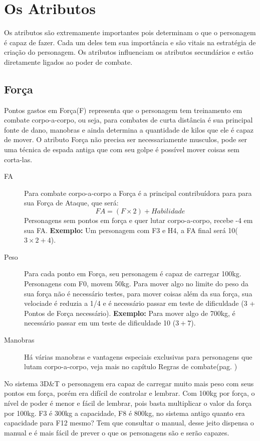 \chapter{Os Atributos}
\label{ch:attributes}

Os atributos são extremamente importantes pois determinam o que o personagem é capaz de fazer. Cada um deles tem sua importância e são vitais na estratégia de criação do personagem. Os atributos influenciam os atributos secundários e estão diretamente ligados ao poder de combate. 

\section{Força}

Pontos gastos em Força(F) representa que o personagem tem treinamento em combate corpo-a-corpo, ou seja, para combates de curta distância é sua principal fonte de dano, manobras e ainda determina a quantidade de kilos que ele é capaz de mover. O atributo Força não precisa ser necessariamente musculos, pode ser uma técnica de espada antiga que com seu golpe é possível mover coisas sem corta-las.

\begin{description}
\item[FA] Para combate corpo-a-corpo a Força é a principal contribuídora para para sua Força de Ataque, que será: 
\[ FA = (F \times 2) + Habilidade \]
Personagens sem pontos em força e quer lutar corpo-a-corpo, recebe -4 em sua FA. {\bf Exemplo:} Um personagem com F3 e H4, a FA final será 10(\(3 \times 2 + 4 \)). 
\item[Peso] Para cada ponto em Força, seu personagem é capaz de carregar 100kg. Personagens com F0, movem 50kg. Para mover algo no limite do peso da sua força não é necessário testes, para mover coisas além da sua força, sua velociade é reduzia a 1/4 e é necessário passar em teste de dificuldade (3 + Pontos de Força necessário). {\bf Exemplo:} Para mover algo de 700kg, é necessário passar em um teste de dificuldade 10 (\(3 + 7\)).
\item[Manobras] Há várias manobras e vantagens especiais exclusivas para personagens que lutam corpo-a-corpo, veja mais no capítulo Regras de combate(pag. \pageref{ch:combat})
\end{description}

\begin{framed}
No sistema 3D\&T o personagem era capaz de carregar muito mais peso com seus pontos em força, porém era difícil de controlar e lembrar. Com 100kg por força, o nível de poder é menor e fácil de lembrar, pois basta multiplicar o valor da força por 100kg. F3 é 300kg a capacidade, F8 é 800kg, no sistema antigo quanto era capacidade para F12 mesmo? Tem que consultar o manual, desse jeito dispensa o manual e é mais fácil de prever o que os personagens são e serão capazes.
\end{framed}

